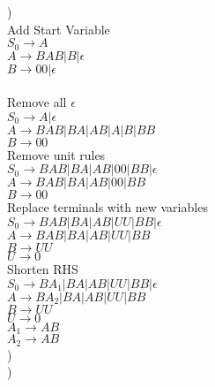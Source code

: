 \documentclass[11pt]{article}
\begin{document}
)\\
Add Start Variable \\
$S_0 \to A$\\
$A \to BAB | B | \epsilon$\\
$B \to 00 | \epsilon$\\ \\

Remove all $\epsilon$\\
$S_0 \to A|\epsilon$\\
$A\to BAB|BA|AB|A|B|BB$\\
$B \to 00$\\

Remove unit rules\\
$S_0 \to BAB|BA|AB|00|BB|\epsilon$\\
$A \to BAB|BA|AB|00|BB$\\
$B \to 00$\\

Replace terminals with new variables\\
$S_0 \to BAB|BA|AB|UU|BB|\epsilon$\\
$A \to BAB|BA|AB|UU|BB$\\
$B \to UU$\\
$U \to 0$\\

Shorten RHS\\
$S_0 \to BA_1|BA|AB|UU|BB|\epsilon$\\
$A \to BA_2|BA|AB|UU|BB$\\
$B \to UU$\\
$U \to 0$\\
$A_1 \to AB$\\
$A_2 \to AB$\\

)\\

)\\
\end{document}
